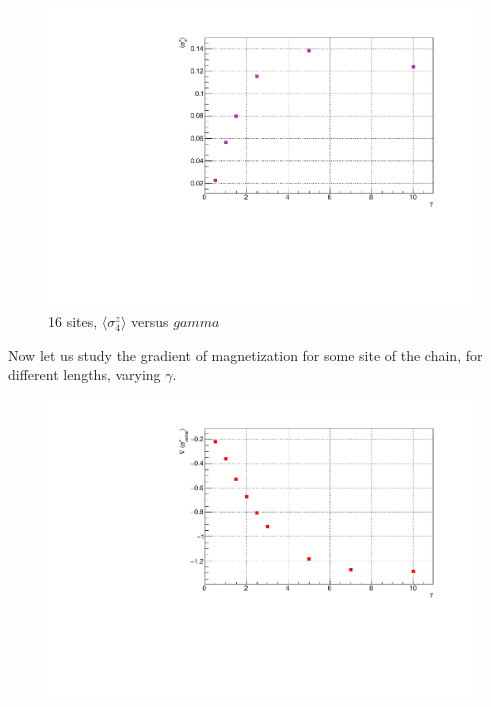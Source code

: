 \begin{figure}[H]
    \centering
    \includegraphics[scale=0.7]{Figures/16sites/16sites_4thSiteVSgamma.pdf}
    \caption{16 sites, $\langle\sigma^z_4\rangle$ versus $gamma$}
    \label{fig:my_label}
\end{figure}

Now let us study the gradient of magnetization for some site of the chain, for different lengths, varying $\gamma$.

\begin{figure}[H]
    \centering
    \includegraphics[scale=0.7]{Figures/8sites_comparison/8sites_gradLM_centerChainVSgamma.pdf}
    \caption{}
    \label{fig:my_label}
\end{figure}

